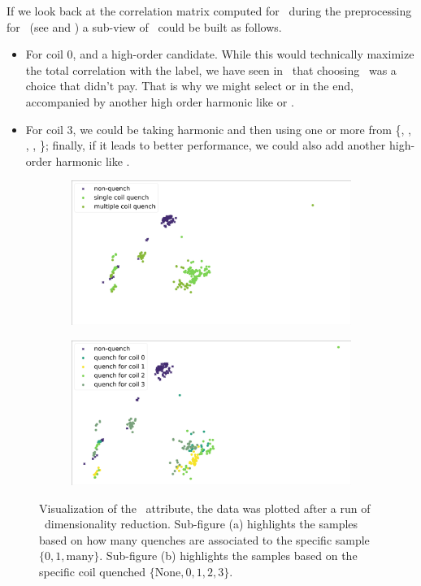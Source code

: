 If we look back at the correlation matrix computed for \cnmod\ during the preprocessing for \qrp\
(see  and ) a sub-view of \cnmod\ could be built as follows.
\begin{itemize}
	\item For coil $0$, \cnmod[2] and a high-order candidate. While this would
		technically maximize the total correlation with the label, we have seen in \qrp\
		that choosing \cnmod[2]\ was a choice that didn't pay. That is why we might select
		\cnmod[3] or \cnmod[6] in the end, accompanied by another high order harmonic like
		\cnmod[9] or \cnmod[11].
	\item For coil $3$, we could be taking harmonic \cnmod[1] and then using one or more from
	      \{\cnmod[4], \cnmod[5], \cnmod[6], \cnmod[7], \cnmod[8]\}; finally, if it leads to
	      better performance, we could also add another high-order harmonic like \cnmod[10].
\end{itemize}
\begin{figure}[!ht]
	\centering
	\begin{subfigure}{0.6\linewidth}
		\centering
		\includegraphics[width=\linewidth]{img/quench_dist_qlp/single_vs_multiple_Cnmod.png}
		\subcaption{}
	\end{subfigure}
	\begin{subfigure}{0.6\linewidth}
		\centering
		\includegraphics[width=\linewidth]{img/quench_dist_qlp_cnmod.png}
		\subcaption{}
	\end{subfigure}
	\caption{Visualization of the \cnmod\ attribute, the data was plotted after a run of \pca\
		dimensionality reduction. Sub-figure (a) highlights the samples based on how many quenches
		are associated to the specific sample $\{0, 1, \text{many}\}$. Sub-figure (b) highlights the
		samples based on the specific coil quenched $\{\text{None}, 0, 1, 2, 3\}$.}
	\label{fig:cnmod-coilq-dist}
\end{figure}

